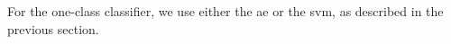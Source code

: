 \documentclass[draftcls,onecolumn,12pt]{IEEEtran}
\begin{document}
For the one-class classifier, we use either the \ac{ae} or the \ac{svm}, as described in the previous section. 
%
%
%
% 
%
%    

\end{document}
